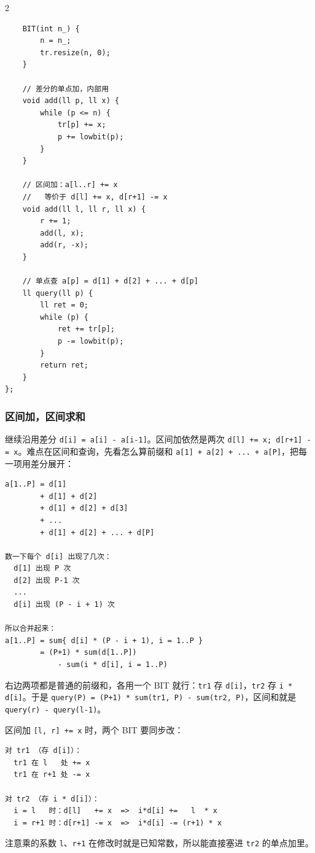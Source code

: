 \begin{multicols*}{2}
\begin{verbatim}
	BIT(int n_) {
		n = n_;
		tr.resize(n, 0);
	}

	// 差分的单点加，内部用
	void add(ll p, ll x) {
		while (p <= n) {
			tr[p] += x;
			p += lowbit(p);
		}
	}

	// 区间加：a[l..r] += x
	//   等价于 d[l] += x, d[r+1] -= x
	void add(ll l, ll r, ll x) {
		r += 1;
		add(l, x);
		add(r, -x);
	}

	// 单点查 a[p] = d[1] + d[2] + ... + d[p]
	ll query(ll p) {
		ll ret = 0;
		while (p) {
			ret += tr[p];
			p -= lowbit(p);
		}
		return ret;
	}
};
		\end{verbatim}

		\subsubsection{区间加，区间求和}

		继续沿用差分 \verb|d[i] = a[i] - a[i-1]|。区间加依然是两次 \verb|d[l] += x; d[r+1] -= x|。难点在区间和查询，先看怎么算前缀和 \verb|a[1] + a[2] + ... + a[P]|，把每一项用差分展开：

		\begin{verbatim}
a[1..P] = d[1]
        + d[1] + d[2]
        + d[1] + d[2] + d[3]
        + ...
        + d[1] + d[2] + ... + d[P]

数一下每个 d[i] 出现了几次：
  d[1] 出现 P 次
  d[2] 出现 P-1 次
  ...
  d[i] 出现 (P - i + 1) 次

所以合并起来：
a[1..P] = sum{ d[i] * (P - i + 1), i = 1..P }
        = (P+1) * sum(d[1..P])
            - sum(i * d[i], i = 1..P)
		\end{verbatim}

		右边两项都是普通的前缀和，各用一个 BIT 就行：\verb|tr1| 存 \verb|d[i]|，\verb|tr2| 存 \verb|i * d[i]|。于是 \verb|query(P) = (P+1) * sum(tr1, P) - sum(tr2, P)|，区间和就是 \verb|query(r) - query(l-1)|。

		区间加 \verb|[l, r] += x| 时，两个 BIT 要同步改：

		\begin{verbatim}
对 tr1 （存 d[i]）：
  tr1 在 l   处 += x
  tr1 在 r+1 处 -= x

对 tr2 （存 i * d[i]）：
  i = l   时：d[l]   += x  =>  i*d[i] +=   l  * x
  i = r+1 时：d[r+1] -= x  =>  i*d[i] -= (r+1) * x
		\end{verbatim}

		注意乘的系数 \verb|l|、\verb|r+1| 在修改时就是已知常数，所以能直接塞进 \verb|tr2| 的单点加里。

		\begin{verbatim}


\end{verbatim}
\end{multicols*}
